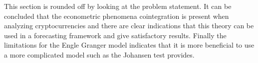This section is rounded off by looking at the problem statement. It can be concluded that the econometric phenomena cointegration is present when analyzing cryptocurrencies and there are clear indications that this theory can be used in a forecasting framework and give satisfactory results. Finally the limitations for the Engle Granger model indicates that it is more beneficial to use a more complicated model such as the Johansen test provides.



